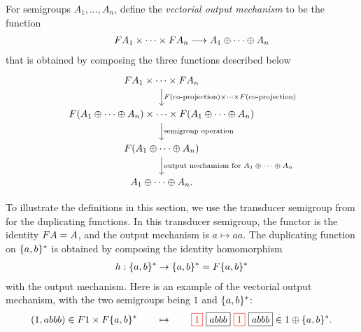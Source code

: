 For semigroups $A_1,\ldots,A_n$, define the \emph{vectorial output mechanism} to be the 
function%
\begin{align*}
\qquad\functor A_1 \times \cdots \times \functor A_n \longrightarrow A_1 \oplus \cdots \oplus A_n
\end{align*}
that is obtained by composing the three functions described below
\[
\begin{tikzcd}
\functor A_1 \times \cdots \times \functor A_n
\ar[d,"\functor(\text{co-projection}) \times \cdots \times \functor(\text{co-projection})"]
\\
\functor(A_1 \oplus \cdots \oplus A_n)
\times
\cdots
\times 
\functor(A_1 \oplus \cdots \oplus A_n)
\ar[d,"\text{semigroup operation}"]
\\
\functor(A_1 \oplus \cdots \oplus A_n)
\ar[d, "\text{output mechamism for $A_1 \oplus \cdots \oplus A_n$}"]\\ 
A_1 \oplus \cdots \oplus A_n.
\end{tikzcd}
\]

\begin{example}
    To illustrate the definitions in this section, we use the transducer semigroup  from  for the duplicating functions. In this transducer semigroup, the functor is the identity $\functor A = A$, and the output mechanism is $a \mapsto aa$. The duplicating function on $\{a,b\}^*$ is obtained by composing the identity homomorphism 
    \begin{align*}
        h : \set{a,b}^* \to \set{a,b}^* = \functor \set{a,b}^*
    \end{align*}
    with the output mechanism.
    Here is an example of  the vectorial output mechanism, with the two semigroups being $1$ and $\{a,b\}^*$:
\begin{align*}
    (1,abbb) \in \functor 1 \times \functor \set{a,b}^* \qquad \mapsto \qquad 
\red{\boxed{1}}\  \boxed{abbb} \ \red{\boxed{1}} \  \boxed{abbb} \in 1 \oplus \set{a,b}^*.
\end{align*}
\end{example}

